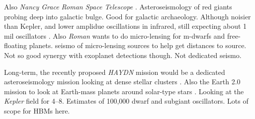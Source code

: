 
Also \emph{Nancy Grace Roman Space Telescope} \citep[\emph{Roman}, formerly \emph{WFIRST};][]{Spergel.Gehrels.ea2015}. Asteroseismology of red giants probing deep into galactic bulge. Good for galactic archaeology. Although noisier than Kepler, and lower amplidue oscillations in infrared, still expecting about 1 mil oscillators \citep{Gould.Huber.ea2015}. Also \emph{Roman} wants to do micro-lensing for m-dwarfs and free-floating planets. seismo of micro-lensing sources to help get distances to source. Not so good synergy with exoplanet detections though. Not dedicated seismo.

Long-term, the recently proposed \emph{HAYDN} mission would be a dedicated asteroseismology mission looking at dense stellar clusters \citep{Miglio.Girardi.ea2021}. Also the Earth 2.0 mission to look at Earth-mass planets around solar-type stars \citep{Ge.Zhang.ea2022}. Looking at the \emph{Kepler} field for \SIrange{4}{8}{\year}. Estimates of 100,000 dwarf and subgiant oscillators. Lots of scope for HBMs here.
